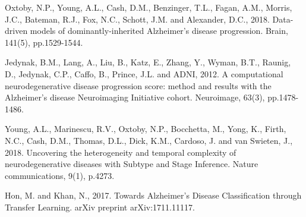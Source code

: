 \documentclass{llncs}
\begin{document}

\begin{thebibliography}{5}



Oxtoby, N.P., Young, A.L., Cash, D.M., Benzinger, T.L., Fagan, A.M., Morris, J.C., Bateman, R.J., Fox, N.C., Schott, J.M. and Alexander, D.C., 2018. Data-driven models of dominantly-inherited Alzheimer’s disease progression. Brain, 141(5), pp.1529-1544.

Jedynak, B.M., Lang, A., Liu, B., Katz, E., Zhang, Y., Wyman, B.T., Raunig, D., Jedynak, C.P., Caffo, B., Prince, J.L. and ADNI, 2012. A computational neurodegenerative disease progression score: method and results with the Alzheimer's disease Neuroimaging Initiative cohort. Neuroimage, 63(3), pp.1478-1486.





Young, A.L., Marinescu, R.V., Oxtoby, N.P., Bocchetta, M., Yong, K., Firth, N.C., Cash, D.M., Thomas, D.L., Dick, K.M., Cardoso, J. and van Swieten, J., 2018. Uncovering the heterogeneity and temporal complexity of neurodegenerative diseases with Subtype and Stage Inference. Nature communications, 9(1), p.4273.



Hon, M. and Khan, N., 2017. Towards Alzheimer's Disease Classification through Transfer Learning. arXiv preprint arXiv:1711.11117.



\end{thebibliography}
\end{document}
